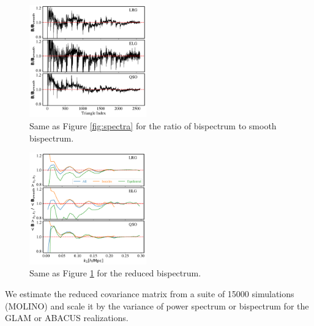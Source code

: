 \begin{figure}
    \centering
    \includegraphics[width=0.45\textwidth]{figures/spectra_ratio.pdf}
    \caption{Same as Figure \ref{fig:spectra} for the ratio of bispectrum to smooth bispectrum.}
    \label{fig:spectra_ratio}
\end{figure}

\begin{figure}
    \centering
    \includegraphics[width=0.45\textwidth]{figures/spectra_ratio_reduced.pdf}
    \caption{Same as Figure \ref{fig:spectra_ratio} for the reduced bispectrum.}
    \label{fig:spectra_ratio_reduced}
\end{figure}

We estimate the reduced covariance matrix from a suite of 15000 simulations (MOLINO) and scale it by the variance of power spectrum or bispectrum for the GLAM or ABACUS realizations.